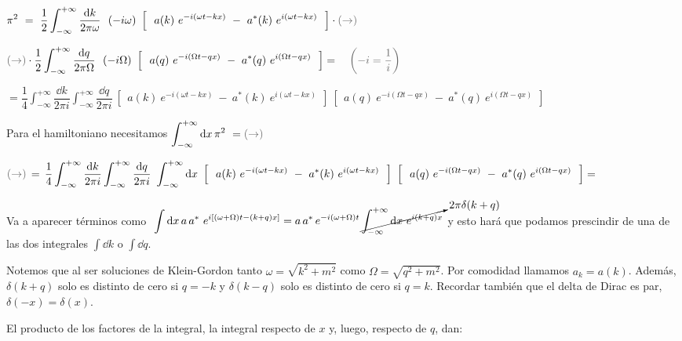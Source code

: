 $\displaystyle \pi^2 \ = \
\dfrac 1 2   \int_{-\infty}^{+\infty} 
\dfrac{\dd k}{2\pi \omega} \ \ (-i\omega) \ \left[ \ 
\  a(k)\ e^{-i(\omega t-kx)} \ - \ a^*(k)\ e^{i(\omega t-kx)} \ 
\ \right]
\cdot \textcolor{gris}{(\to)}$

$\displaystyle  \textcolor{gris}{(\to)}\cdot
\dfrac 1 2   \int_{-\infty}^{+\infty} 
\dfrac{\dd q}{2\pi \Omega} \ \ (-i\Omega) \ \left[ \ 
\  a(q)\ e^{-i(\Omega t-qx)} \ - \ a^*(q)\ e^{i(\Omega t-qx)} \ 
\ \right] =  \quad \textcolor{gris} {\left( -i = \dfrac 1 i \right) } \quad $

$\displaystyle = \dfrac 1 4    \int_{-\infty}^{+\infty} 
\dfrac{\dd k}{2\pi i}  \int_{-\infty}^{+\infty} 
\dfrac{\dd q}{2\pi i} \ 
\left[ \ 
\  a(k)\ e^{-i(\omega t-kx)} \ - \ a^*(k)\ e^{i(\omega t-kx)} \ 
\ \right] \ \left[ \ 
\  a(q)\ e^{-i(\Omega t-qx)} \ - \ a^*(q)\ e^{i(\Omega t-qx)} \ 
\ \right] $

\vspace{5mm}
Para el hamiltoniano necesitamos $\displaystyle \int_{-\infty}^{+\infty} \dd x \, \pi^2 \ = \textcolor{gris}{(\to)}$

\begin{footnotesize}
$\displaystyle \textcolor{gris}{(\to)}\, = \, 
 \dfrac 1 4    \int_{-\infty}^{+\infty} 
\dfrac{\dd k}{2\pi i}  \int_{-\infty}^{+\infty} 
\dfrac{\dd q}{2\pi i} \  \int_{-\infty}^{+\infty} \dd x  \ 
\left[ \ 
\  a(k)\ e^{-i(\omega t-kx)} \ - \ a^*(k)\ e^{i(\omega t-kx)} \ 
\ \right] \ \left[ \ 
\  a(q)\ e^{-i(\Omega t-qx)} \ - \ a^*(q)\ e^{i(\Omega t-qx)} \ 
\ \right] =$ 
\end{footnotesize}

\vspace{5mm}
Va a aparecer términos como $\ \displaystyle \int \dd x \, a \, a^* \ e^{i[(\omega+\Omega)t-(k+q)x]}=a\, a^*\, e^{-i(\omega+\Omega)t}\, \cancelto{2\pi \delta(k+q)} {\int_{-\infty}^{+\infty} \dd x\  e^{i(k+q)x}}$ y esto hará que podamos prescindir de una de las dos integrales $\int \dd k$ o $\int \dd q$.

Notemos que al ser soluciones de Klein-Gordon tanto $\omega=\sqrt{k^2+m^2}$ como $\Omega=\sqrt{q^2+m^2}$. Por comodidad llamamos $a_k=a(k)$. Además, $\delta(k+q)$ solo es distinto de cero si $q=-k$ y $\delta(k-q)$ solo es distinto de cero si $q=k$. Recordar también que el delta de Dirac es par, $\delta(-x)=\delta(x)$.

\vspace{5mm}
El producto de los factores de la integral, la integral respecto de $x$ y, luego, respecto de $q$, dan:

